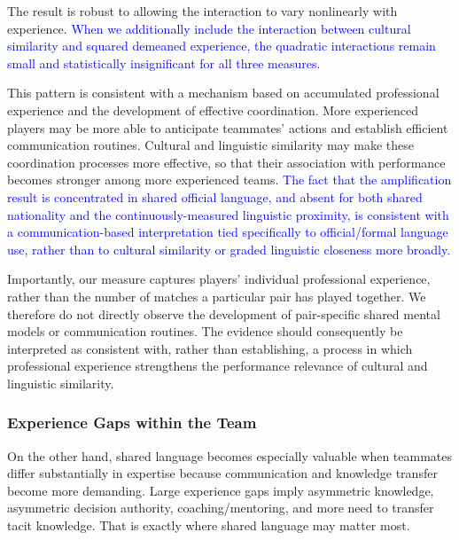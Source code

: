 \documentclass[10pt]{article}
\begin{document}
The result is robust to allowing the interaction to vary nonlinearly with experience.
\textcolor{blue}{When we additionally include the interaction between cultural similarity and squared demeaned experience, the quadratic interactions remain small and statistically insignificant for all three measures.}

This pattern is consistent with a mechanism based on accumulated professional experience and the development of effective coordination. More experienced players may be more able to anticipate teammates' actions and establish efficient communication routines. Cultural and linguistic similarity may make these coordination processes more effective, so that their association with performance becomes stronger among more experienced teams. \textcolor{blue}{The fact that the amplification result is concentrated in shared official language, and absent for both shared nationality and the continuously-measured linguistic proximity, is consistent with a communication-based interpretation tied specifically to official/formal language use, rather than to cultural similarity or graded linguistic closeness more broadly.}

Importantly, our measure captures players' individual professional experience, rather than the number of matches a particular pair has played together. We therefore do not directly observe the development of pair-specific shared mental models or communication routines. The evidence should consequently be interpreted as consistent with, rather than establishing, a process in which professional experience strengthens the performance relevance of cultural and linguistic similarity.


\subsubsection{Experience Gaps within the Team} 

On the other hand, shared language becomes especially valuable when teammates differ substantially in expertise because communication and knowledge transfer become more demanding. Large experience gaps imply asymmetric knowledge, asymmetric decision authority, coaching/mentoring,
 and more need to transfer tacit knowledge. That is exactly where shared language may matter most. 
\end{document}
